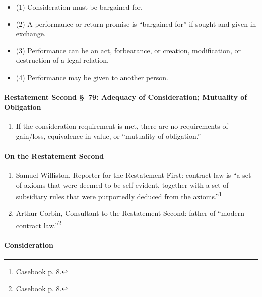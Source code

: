 \begin{itemize}
    \item (1) Consideration must be bargained for. 
    \item (2) A performance or return promise is ``bargained for'' if sought and given in exchange.
    \item (3) Performance can be an act, forbearance, or creation, 
    modification, or destruction of a legal relation.
    \item (4) Performance may be given to another person.
\end{itemize}

\paragraph{Restatement Second \S\ 79: Adequacy of Consideration; Mutuality 
of Obligation}

\begin{enumerate}
    \item If the consideration requirement is met, there are no requirements 
    of gain/loss, equivalence in value, or ``mutuality of obligation.''
\end{enumerate}

\paragraph{On the Restatement Second}

\begin{enumerate}
    \item Samuel Williston, Reporter for the Restatement First: contract law 
    is ``a set of axioms that were deemed to be self-evident, together with a 
    set of subsidiary rules that were purportedly deduced from the 
    axioms.''\footnote{Casebook p. 8.}
    \item Arthur Corbin, Consultant to the Restatement Second: father of 
    ``modern contract law.''\footnote{Casebook p. 8.}
\end{enumerate}

\paragraph{Consideration}

